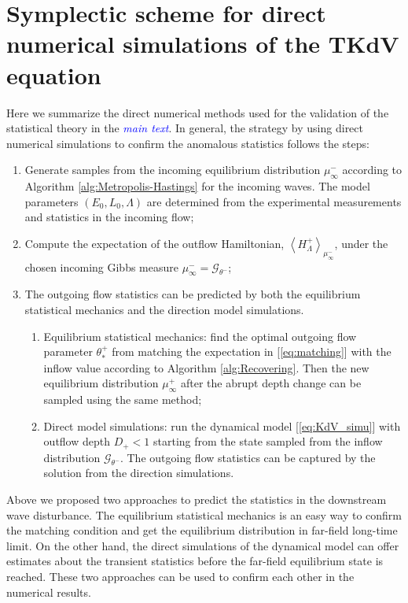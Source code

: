 \documentclass[9pt,twoside,lineno]{pnas-new}
\theoremstyle{plain}
\theoremstyle{plain}
\begin{document}
\section{Symplectic scheme for direct numerical simulations of the TKdV equation}

Here we summarize the direct numerical methods used for the validation
of the statistical theory in the \textcolor{blue}{\emph{main text}}. In general, the
strategy by using direct numerical simulations to confirm the anomalous
statistics follows the steps:
\begin{enumerate}
\item Generate samples from the incoming equilibrium distribution $\mu_{\infty}^{-}$
according to Algorithm \ref{alg:Metropolis-Hastings} for the incoming
waves. The model parameters $\left(E_{0},L_{0},\Lambda\right)$ are
determined from the experimental measurements and statistics in the
incoming flow;
\item Compute the expectation of the outflow Hamiltonian, $\left\langle H_{\Lambda}^{+}\right\rangle _{\mu_{\infty}^{-}}$,
under the chosen incoming Gibbs measure $\mu_{\infty}^{-}=\mathcal{G}_{\theta^{-}}$;
\item The outgoing flow statistics can be predicted by both the equilibrium
statistical mechanics and the direction model simulations. 
\begin{enumerate}
\item Equilibrium statistical mechanics: find the optimal outgoing flow
parameter $\theta_{*}^{+}$ from matching the expectation in [\ref{eq:matching}]
with the inflow value according to Algorithm \ref{alg:Recovering}.
Then the new equilibrium distribution $\mu_{\infty}^{+}$ after the
abrupt depth change can be sampled using the same method;
\item Direct model simulations: run the dynamical model [\ref{eq:KdV_simu}]
with outflow depth $D_{+}<1$ starting from the state sampled from
the inflow distribution $\mathcal{G}_{\theta^{-}}$. The outgoing
flow statistics can be captured by the solution from the direction
simulations. 
\end{enumerate}
\end{enumerate}
Above we proposed two approaches to predict the statistics in the
downstream wave disturbance. The equilibrium statistical mechanics
is an easy way to confirm the matching condition and get the equilibrium
distribution in far-field long-time limit. On the other hand, the
direct simulations of the dynamical model can offer estimates about
the transient statistics before the far-field equilibrium state is
reached. These two approaches can be used to confirm each other in
the numerical results.
\end{document}
